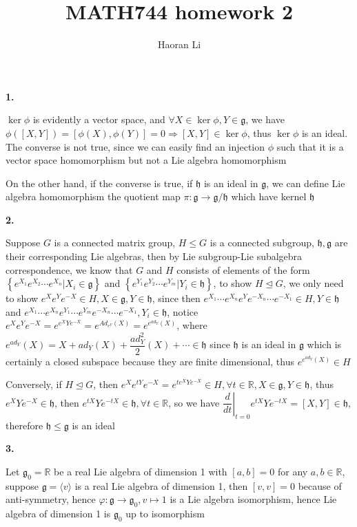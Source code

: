 \documentclass[10pt]{article}
\title{MATH744 homework 2}
\author{Haoran Li}
\date{}
\newcommand{\<}[1]{\langle #1 \rangle}
\begin{document}
\maketitle

\textbf{1.} \par
$\ker\phi$ is evidently a vector space, and $\forall X\in\ker\phi, Y\in\mathfrak{g}$, we have $\phi([X,Y])=[\phi(X),\phi(Y)]=0\Rightarrow [X,Y]\in\ker\phi$, thus $\ker\phi$ is an ideal. The converse is not true, since we can easily find an injection $\phi$ such that it is a vector space homomorphism but not a Lie algebra homomorphism \par
On the other hand, if the converse is true, if $\mathfrak{h}$ is an ideal in $\mathfrak{g}$, we can define Lie algebra homomorphism the quotient map $\pi:\mathfrak{g}\rightarrow\mathfrak{g}/\mathfrak{h}$ which have kernel $\mathfrak{h}$ \par
\textbf{2.} \par
Suppose $G$ is a connected matrix group, $H\leq G$ is a connected subgroup, $\mathfrak{h},\mathfrak{g}$ are their corresponding Lie algebras, then by Lie subgroup-Lie subalgebra correspondence, we know that $G$ and $H$ consists of elements of the form $\left\{e^{X_1}e^{X_2}\cdots e^{X_n}|X_i\in\mathfrak{g}\right\}$ and $\left\{e^{Y_1}e^{Y_2}\cdots e^{Y_m}|Y_i\in\mathfrak{h}\right\}$, to show $H\trianglelefteq G$, we only need to show $e^Xe^Ye^{-X}\in H, X\in\mathfrak{g},Y\in\mathfrak{h}$, since then $e^{X_1}\cdots e^{X_n}e^{Y}e^{-X_n}\cdots e^{-X_1}\in H, Y\in\mathfrak{h}$ and $e^{X_1}\cdots e^{X_n}e^{Y_1}\cdots e^{Y_m}e^{-X_n}\cdots e^{-X_1},Y_i\in\mathfrak{h}$, notice $\displaystyle e^Xe^Ye^{-X}=e^{e^XYe^{-X}}=e^{Ad_{e^Y}(X)}=e^{e^{ad_{Y}}(X)}$, where $e^{ad_Y}(X)=X+ad_Y(X)+\dfrac{ad_Y^2}{2}(X)+\cdots\in\mathfrak{h}$ since $\mathfrak{h}$ is an ideal in $\mathfrak{g}$ which is certainly a closed subspace because they are finite dimensional, thus $e^{e^{ad_Y}(X)}\in H$ \par
Conversely, if $H\trianglelefteq G$, then $e^{X}e^{tY}e^{-X}=e^{te^{X}Ye^{-X}}\in H, \forall t\in\mathbb R, X\in\mathfrak{g}, Y\in\mathfrak{h}$, thus $e^{X}Ye^{-X}\in\mathfrak{h}$, then $e^{tX}Ye^{-tX}\in\mathfrak{h}, \forall t\in\mathbb R$, so we have $\left.\dfrac{d}{dt}\right|_{t=0}e^{tX}Ye^{-tX}=[X,Y]\in\mathfrak{h}$, therefore $\mathfrak{h}\leq\mathfrak{g}$ is an ideal \par
\textbf{3.} \par
Let $\mathfrak{g}_0=\mathbb{R}$ be a real Lie algebra of dimension 1 with $[a,b]=0$ for any $a,b\in\mathbb{R}$, suppose $\mathfrak{g}=\<{v}$ is a real Lie algebra of dimension 1, then $[v,v]=0$ because of anti-symmetry, hence $\varphi:\mathfrak{g}\rightarrow\mathfrak{g}_0,v\mapsto 1$ is a Lie algebra isomorphism, hence Lie algebra of dimension 1 is $\mathfrak{g}_0$ up to isomorphism \par
\end{document}
